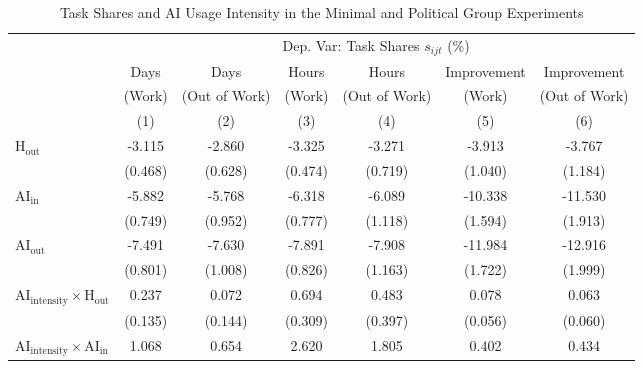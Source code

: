 \begin{table}[H]
\centering
\caption{Task Shares and AI Usage Intensity in the Minimal and Political Group Experiments}
\footnotesize
\begin{threeparttable}
\begin{tabular}{l*{6}{c}}
\toprule\toprule
& \multicolumn{6}{c}{Dep. Var: Task Shares $s_{ijt}$ (\%)} \\
\cmidrule(lr){2-7}
& Days & Days & Hours & Hours & Improvement & Improvement \\
& (Work) & (Out of Work) & (Work) & (Out of Work) & (Work) & (Out of Work) \\
\cmidrule(lr){2-2}\cmidrule(lr){3-3}\cmidrule(lr){4-4}\cmidrule(lr){5-5}\cmidrule(lr){6-6}\cmidrule(lr){7-7}
& (1) & (2) & (3) & (4) & (5) & (6) \\
\midrule
\midrule
$\mathrm{H}_{\text{out}}$&      -3.115\sym{***}&      -2.860\sym{***}&      -3.325\sym{***}&      -3.271\sym{***}&      -3.913\sym{***}&      -3.767\sym{***}\\
            &     (0.468)         &     (0.628)         &     (0.474)         &     (0.719)         &     (1.040)         &     (1.184)         \\
$\mathrm{AI}_{\text{in}}$&      -5.882\sym{***}&      -5.768\sym{***}&      -6.318\sym{***}&      -6.089\sym{***}&     -10.338\sym{***}&     -11.530\sym{***}\\
            &     (0.749)         &     (0.952)         &     (0.777)         &     (1.118)         &     (1.594)         &     (1.913)         \\
$\mathrm{AI}_{\text{out}}$&      -7.491\sym{***}&      -7.630\sym{***}&      -7.891\sym{***}&      -7.908\sym{***}&     -11.984\sym{***}&     -12.916\sym{***}\\
            &     (0.801)         &     (1.008)         &     (0.826)         &     (1.163)         &     (1.722)         &     (1.999)         \\
$\mathrm{AI}_{\text{intensity}} \times \mathrm{H}_{\text{out}}$&       0.237\sym{*}  &       0.072         &       0.694\sym{**} &       0.483         &       0.078         &       0.063         \\
            &     (0.135)         &     (0.144)         &     (0.309)         &     (0.397)         &     (0.056)         &     (0.060)         \\
$\mathrm{AI}_{\text{intensity}} \times \mathrm{AI}_{\text{in}}$&       1.068\sym{***}&       0.654\sym{***}&       2.620\sym{***}&       1.805\sym{***}&       0.402\sym{***}&       0.434\sym{***}\\

\end{tabular}
\end{threeparttable}
\end{table}
